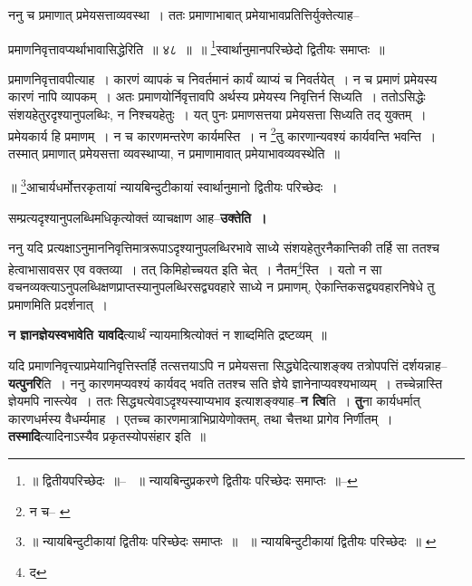 \documentclass[article,12pt,a4paper]{memoir}
\begin{document}
	  \pstart ननु च प्रमाणात् प्रमेयसत्ताव्यवस्था । ततः प्रमाणाभाबात् प्रमेयाभावप्रतित्तिर्युक्तेत्याह--
	\pend
       
	  \bigskip
	  \begingroup
	

	  \pstart प्रमाणनिवृत्तावप्यर्थाभावासिद्धेरिति ॥ ४८ ॥ ॥ \footnote{॥ द्वितीयपरिच्छेदः ॥--\cite{dp-msD} \cite{dp-msB} ॥ न्यायबिन्दुप्रकरणे द्वितीयः परिच्छेदः समाप्तः ॥--\cite{dp-edE}}स्वार्थानुमानपरिच्छेदो द्वितीयः समाप्तः ॥
	\pend
      
	  \endgroup
	 

	  \pstart प्रमाणनिवृत्तावपीत्याह । कारणं व्यापकं च निवर्तमानं कार्यं व्याप्यं च निवर्तयेत् । न च प्रमाणं प्रमेयस्य कारणं नापि व्यापकम् । अतः प्रमाणयोर्निवृत्तावपि अर्थस्य प्रमेयस्य निवृत्तिर्न सिध्यति । ततोऽसिद्धेः संशयहेतुरदृश्यानुपलब्धिः, न निश्चयहेतुः । यत् पुनः प्रमाणसत्तया प्रमेयसत्ता सिध्यति तद् युक्तम् । प्रमेयकार्य हि प्रमाणम् । न च कारणमन्तरेण कार्यमस्ति । न \footnote{न च--\cite{dp-msB} \cite{dp-msD}}तु कारणान्यवश्यं कार्यवन्ति भवन्ति । तस्मात् प्रमाणात् प्रमेयसत्ता व्यवस्थाप्या, न प्रमाणामावात् प्रमेयाभावव्यवस्थेति ॥
	\pend
       

	  \pstart ॥ \footnote{॥ न्यायबिन्दुटीकायां द्वितीयः परिच्छेदः समाप्तः ॥ \cite{dp-msA} \cite{dp-msB} \cite{dp-edP} \cite{dp-edH} \cite{dp-edE} ॥ न्यायबिन्दुटीकायां द्वितीयः परिच्छेदः ॥ \cite{dp-msD}}आचार्यधर्मोत्तरकृतायां न्यायबिन्दुटीकायां स्वार्थानुमानो द्वितीयः परिच्छेदः ।
	\pend
      
	  \endgroup
	

	  \pstart सम्प्रत्यदृश्यानुपलब्धिमधिकृत्योक्तं व्याचक्षाण आह--\textbf{उक्तेति ।}
	\pend
      

	  \pstart ननु यदि प्रत्यक्षाऽनुमाननिवृत्तिमात्ररूपाऽदृश्यानुपलब्धिरभावे साध्ये संशयहेतुरनैकान्तिकी तर्हि सा ततश्च हेत्वाभासावसर एव वक्तव्या । तत् किमिहोच्चयत इति चेत् । नैतम\footnote{द}स्ति । यतो न सा वचनव्यक्त्याऽनुपलब्धिक्षणप्राप्तस्यानुपलब्धिरसद्व्यवहारे साध्ये न प्रमाणम्, ऐकान्तिकसद्व्यवहारनिषेधे तु प्रमाणमिति प्रदर्शनात् ।
	\pend
      

	  \pstart \textbf{न ज्ञानज्ञेयस्वभावेति यावदि}त्यार्थं न्यायमाश्रित्योक्तं न शाब्दमिति द्रष्टव्यम् ॥
	\pend
      

	  \pstart यदि प्रमाणनिवृत्त्या\leavevmode{}प्रमेयानिवृत्तिस्तर्हि तत्सत्तयाऽपि न प्रमेयसत्ता सिद्ध्येदित्याशङ्क्य तत्रोपपत्तिं दर्शयन्नाह--\textbf{यत्पुनरि}ति । ननु कारणमप्यवश्यं कार्यवद् भवति ततश्च सति ज्ञेये ज्ञानेनाप्यवश्यभाव्यम् । तच्चेन्नास्ति ज्ञेयमपि नास्त्येव । ततः सिद्ध्यत्येवाऽदृश्यस्याप्यभाव इत्याशङ्क्याह--\textbf{न त्वि}ति । \textbf{तु}ना कार्यधर्मात् कारणधर्मस्य वैधर्म्यमाह । एतच्च कारणमात्राभिप्रायेणोक्तम्, तथा चैत्तथा प्रागेव निर्णीतम् । \textbf{तस्मादि}त्यादिनाऽस्यैव प्रकृतस्योपसंहार इति ॥
	\pend
      
\end{document}
